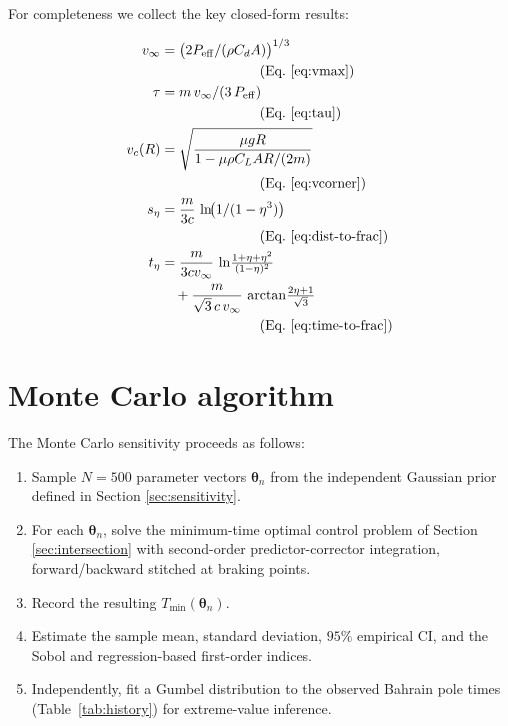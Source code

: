 \documentclass[11pt,twocolumn]{article}
\theoremstyle{definition}
\theoremstyle{remark}
\begin{document}
For completeness we collect the key closed-form results:

\begin{align}
  v_\infty &= \bigl(2P_{\mathrm{eff}}/(\rho C_d A)\bigr)^{1/3}\\
  &\hspace{2.5cm}\text{(Eq.~\ref{eq:vmax})}\notag\\
  \tau &= m\, v_\infty / (3\, P_{\mathrm{eff}})\\
  &\hspace{2.5cm}\text{(Eq.~\ref{eq:tau})}\notag\\
  v_c(R) &= \sqrt{\frac{\mu g R}{1 - \mu \rho C_L A R/(2m)}}\\
  &\hspace{2.5cm}\text{(Eq.~\ref{eq:vcorner})}\notag\\
  s_\eta &= \frac{m}{3c}\, \ln\!\bigl(1/(1-\eta^3)\bigr)\\
  &\hspace{2.5cm}\text{(Eq.~\ref{eq:dist-to-frac})}\notag\\
  t_\eta &= \frac{m}{3 c v_\infty}\,\ln\!\tfrac{1+\eta+\eta^2}{(1-\eta)^2}\notag\\
  &\quad+ \frac{m}{\sqrt{3}\, c\, v_\infty}\,\arctan\!\tfrac{2\eta+1}{\sqrt{3}}\\
  &\hspace{2.5cm}\text{(Eq.~\ref{eq:time-to-frac})}\notag
\end{align}

\section{Monte Carlo algorithm}
\label{app:mc}

The Monte Carlo sensitivity proceeds as follows:
\begin{enumerate}
  \item Sample $N = 500$ parameter vectors $\bm{\theta}_n$ from the
        independent Gaussian prior defined in Section \ref{sec:sensitivity}.
  \item For each $\bm{\theta}_n$, solve the minimum-time optimal control
        problem of Section \ref{sec:intersection} with second-order
        predictor-corrector integration, forward/backward stitched at
        braking points.
  \item Record the resulting $T_{\min}(\bm{\theta}_n)$.
  \item Estimate the sample mean, standard deviation, $95\%$ empirical CI,
        and the Sobol and regression-based first-order indices.
  \item Independently, fit a Gumbel distribution to the observed Bahrain
        pole times (Table~\ref{tab:history}) for extreme-value inference.
\end{enumerate}
\end{document}
